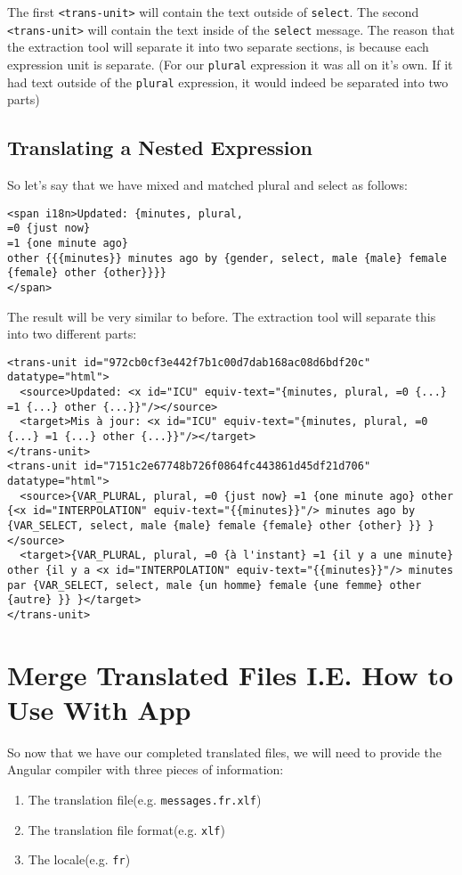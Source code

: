 The first \lstinline{<trans-unit>} will contain the text outside of \lstinline{select}. The second \lstinline{<trans-unit>} will contain the text inside of the \lstinline{select} message. The reason that the extraction tool will separate it into two separate sections, is because each expression unit is separate. (For our \lstinline{plural} expression it was all on it's own. If it had text outside of the \lstinline{plural} expression, it would indeed be separated into two parts)

\subsection{Translating a Nested Expression}
So let's say that we have mixed and matched plural and select as follows: 
\begin{lstlisting}
<span i18n>Updated: {minutes, plural,
=0 {just now}
=1 {one minute ago}
other {{{minutes}} minutes ago by {gender, select, male {male} female {female} other {other}}}}
</span>
\end{lstlisting}

The result will be very similar to before. The extraction tool will separate 
this into two different parts: 
\begin{lstlisting}[caption=src/locale/messages.fr.xlf]
<trans-unit id="972cb0cf3e442f7b1c00d7dab168ac08d6bdf20c" datatype="html">
  <source>Updated: <x id="ICU" equiv-text="{minutes, plural, =0 {...} =1 {...} other {...}}"/></source>
  <target>Mis à jour: <x id="ICU" equiv-text="{minutes, plural, =0 {...} =1 {...} other {...}}"/></target>
</trans-unit>
<trans-unit id="7151c2e67748b726f0864fc443861d45df21d706" datatype="html">
  <source>{VAR_PLURAL, plural, =0 {just now} =1 {one minute ago} other {<x id="INTERPOLATION" equiv-text="{{minutes}}"/> minutes ago by {VAR_SELECT, select, male {male} female {female} other {other} }} }</source>
  <target>{VAR_PLURAL, plural, =0 {à l'instant} =1 {il y a une minute} other {il y a <x id="INTERPOLATION" equiv-text="{{minutes}}"/> minutes par {VAR_SELECT, select, male {un homme} female {une femme} other {autre} }} }</target>
</trans-unit>  
\end{lstlisting}

\section{Merge Translated Files I.E. How to Use With App}
So now that we have our completed translated files, we will need to provide the Angular compiler with three pieces of information: 
\begin{enumerate}
  \item The translation file(e.g. \lstinline{messages.fr.xlf})
  \item The translation file format(e.g. \lstinline{xlf})
  \item The locale(e.g. \lstinline{fr})
\end{enumerate}

